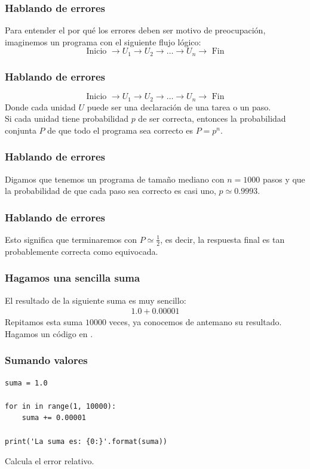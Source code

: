 \documentclass[12pt]{beamer}
\begin{document}
\begin{frame}
\frametitle{Hablando de errores}
Para entender el por qué los errores deben ser motivo de preocupación, imaginemos un programa con el siguiente flujo lógico:
\pause
\begin{equation}
\text{Inicio } \rightarrow U_{1} \rightarrow U_{2} \rightarrow \ldots \rightarrow U_{n} \rightarrow \text{ Fin} 
\label{eq:ecuacion_02_01}
\end{equation}
\end{frame}
\begin{frame}
\frametitle{Hablando de errores}
\begin{equation*}
\text{Inicio } \rightarrow U_{1} \rightarrow U_{2} \rightarrow \ldots \rightarrow U_{n} \rightarrow \text{ Fin} 
\end{equation*}
Donde cada unidad $U$ puede ser una declaración de una tarea o un paso.
\\
\bigskip
\pause
Si cada unidad tiene probabilidad $p$ de ser correcta, entonces la probabilidad conjunta $P$ de que todo el programa sea correcto es $P = p^{n}$.
\\
\end{frame}
\begin{frame}
\frametitle{Hablando de errores}
Digamos que tenemos un programa de tamaño mediano con $n = 1000$ pasos y que la probabilidad de que cada paso sea correcto es casi uno, $p \simeq 0.9993$.
\end{frame}
\begin{frame}
\frametitle{Hablando de errores}
Esto significa que terminaremos con $P \simeq \frac{1}{2}$, es decir, la respuesta final es tan probablemente correcta como equivocada.
\end{frame}
\begin{frame}
\frametitle{Hagamos una sencilla suma}
El resultado de la siguiente suma es muy sencillo:
\pause
\begin{align*}
1.0 + 0.00001
\end{align*}
\pause
Repitamos esta suma $10000$ veces, ya conocemos de antemano su resultado. \pause Hagamos un código en \python.
\end{frame}
\begin{frame}[fragile]
\frametitle{Sumando valores}
\begin{lstlisting}[caption=Sumando en un ciclo]
suma = 1.0

for in in range(1, 10000):
    suma += 0.00001

print('La suma es: {0:}'.format(suma))
\end{lstlisting}
Calcula el error relativo.
\end{frame}
\end{document}
